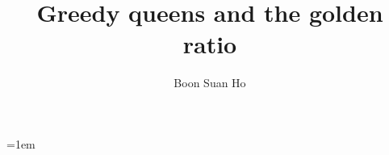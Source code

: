 \usepackage[letterpaper,margin=1in]{geometry}
\usepackage[T1]{fontenc}
\usepackage{lmodern,amssymb,mathtools,microtype,booktabs,capt-of,placeins,needspace,etoolbox}
\usepackage{xcolor}
\usepackage{algorithm,algpseudocode}
\setlength{\belowcaptionskip}{0pt}
\raggedbottom
\usepackage{tikz,chessfss}
\usetikzlibrary{decorations.pathreplacing}
\ifnum{}
\fi
{}
\usepackage{hyperref} %
{}

\makeatletter
{}
\makeatother

\makeatletter
\def\thmhead@plain#1#2#3{%
  \thmname{#1}\thmnumber{\@ifnotempty{#1}{ }\@upn{#2}}%
  \thmnote{ \the\thm@notefont(#3)}}%
\let\thmhead\thmhead@plain
\makeatother

\newtheorem{theorem}{Theorem}
\newtheorem{lemma}[theorem]{Lemma}
\newtheorem{proposition}[theorem]{Proposition}
\newtheorem{corollary}[theorem]{Corollary}
\theoremstyle{definition}
\newtheorem{definition}[theorem]{Definition}
\newtheorem{condition}[theorem]{Condition}
\theoremstyle{remark}
\newtheorem*{remark}{Remark}
\theoremstyle{plain}
\newcommand{\N}{\mathbb N}
\newcommand{\dts}{\mathinner{\ldotp\ldotp}}
\newcommand{\J}{\mathcal J}
\newcommand{\last}{\operatorname{last}_{12}}
\newcommand{\todo}[1]{\textcolor{red!60}{#1}}
\newcommand{\xnote}[1]{}
\allowdisplaybreaks[1]
\emergencystretch=1em
\title[Greedy queens and the golden ratio]{Greedy queens and the golden ratio}
\author{Boon Suan Ho}
\address{Department of Mathematics, National University of Singapore}
\date{}
